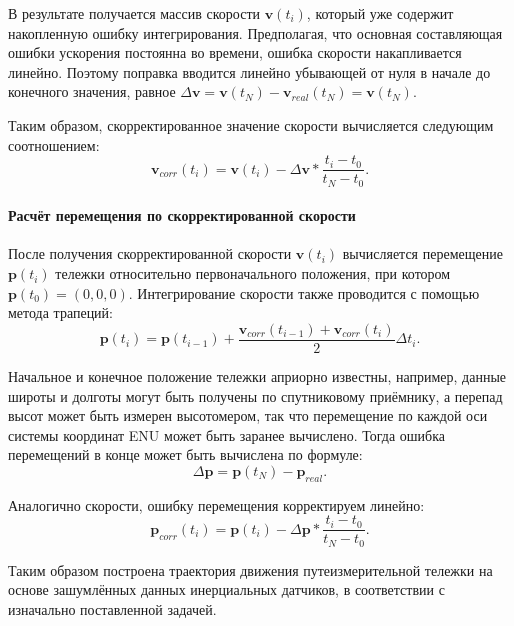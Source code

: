 В результате получается массив скорости $\bm{v}(t_i)$, который уже содержит накопленную ошибку интегрирования. Предполагая, что основная составляющая ошибки ускорения постоянна во времени, ошибка скорости накапливается линейно. Поэтому поправка вводится линейно убывающей от нуля в начале до конечного значения, равное $\Delta \bm{v} = \bm{v}(t_N) - \bm{v}_{real}(t_N) = \bm{v}(t_N)$.

Таким образом, скорректированное значение скорости вычисляется следующим соотношением:
\begin{equation}
	\bm{v}_{corr}(t_i) = \bm{v}(t_i) - \Delta \bm{v} * \frac{t_i - t_0}{t_N - t_0} \text{.}
\end{equation}


\paragraph{Расчёт перемещения по скорректированной скорости}
После получения скорректированной скорости $\bm{v}(t_i)$ вычисляется перемещение $\bm{p}(t_i)$ тележки относительно первоначального положения, при котором $\bm{p}(t_0) = (0, 0, 0)$. Интегрирование скорости также проводится с помощью метода трапеций:
\begin{equation}
	\bm{p}(t_i) = \bm{p}(t_{i-1}) + \frac{\bm{v}_{corr}(t_{i-1}) + \bm{v}_{corr}(t_i)}{2} \Delta t_i \text{.}
\end{equation}

Начальное и конечное положение тележки априорно известны, например, данные широты и долготы могут быть получены по спутниковому приёмнику, а перепад высот может быть измерен высотомером, так что перемещение по каждой оси системы координат ENU может быть заранее вычислено. Тогда ошибка перемещений в конце может быть вычислена по формуле:
\begin{equation*}
	\Delta \bm{p} = \bm{p}(t_N) - \bm{p}_{real} \text{.}
\end{equation*}

Аналогично скорости, ошибку перемещения корректируем линейно:
\begin{equation}
	\bm{p}_{corr}(t_i) = \bm{p}(t_i) - \Delta \bm{p} * \frac{t_i - t_0}{t_N - t_0} \text{.}
\end{equation}

Таким образом построена траектория движения путеизмерительной тележки на основе зашумлённых данных инерциальных датчиков, в соответствии с изначально поставленной задачей.